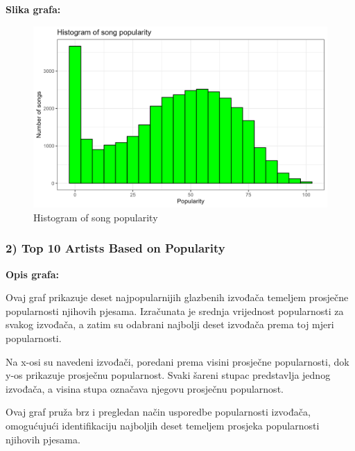 	\textbf{Slika grafa:}
	\begin{figure}[H]
		\includegraphics[scale=0.9]{slike/Histogram of song popularity.png}
		\centering
		\caption{Histogram of song popularity}
		
	\end{figure}

	\subsubsection{2) Top 10 Artists Based on Popularity}
	
	\textbf{Opis grafa:}
	
	Ovaj graf prikazuje deset najpopularnijih glazbenih izvođača temeljem prosječne popularnosti njihovih pjesama. Izračunata je srednja vrijednost popularnosti za svakog izvođača, a zatim su odabrani najbolji deset izvođača prema toj mjeri popularnosti.
	
	Na x-osi su navedeni izvođači, poredani prema visini prosječne popularnosti, dok y-os prikazuje prosječnu popularnost. Svaki šareni stupac predstavlja jednog izvođača, a visina stupa označava njegovu prosječnu popularnost.
	
	Ovaj graf pruža brz i pregledan način usporedbe popularnosti izvođača, omogućujući identifikaciju najboljih deset temeljem prosjeka popularnosti njihovih pjesama.
	
